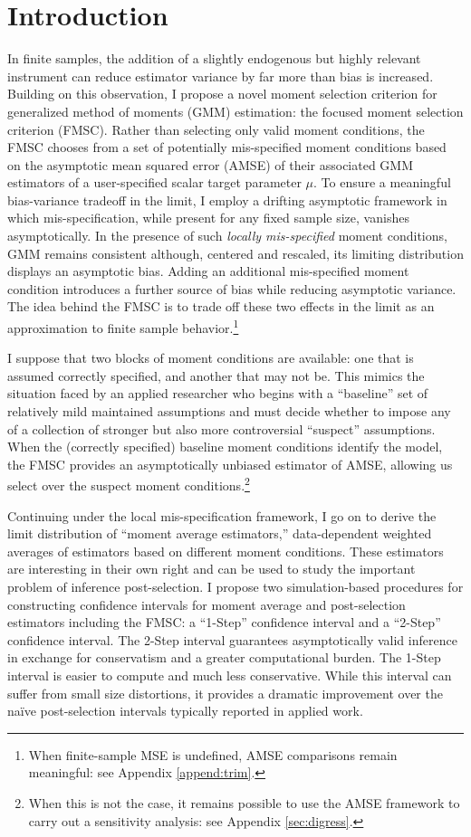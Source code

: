 \section{Introduction}
In finite samples, the addition of a slightly endogenous but highly relevant instrument can reduce estimator variance by far more than bias is increased. 
Building on this observation, I propose a novel moment selection criterion for generalized method of moments (GMM) estimation: the focused moment selection criterion (FMSC). 
Rather than selecting only valid moment conditions, the FMSC chooses from a set of potentially mis-specified moment conditions based on the asymptotic mean squared error (AMSE) of their associated GMM estimators of a user-specified scalar target parameter $\mu$.
To ensure a meaningful bias-variance tradeoff in the limit, I employ a drifting asymptotic framework in which mis-specification, while present for any fixed sample size, vanishes asymptotically.
In the presence of such \emph{locally mis-specified} moment conditions, GMM remains consistent although, centered and rescaled, its limiting distribution displays an asymptotic bias. Adding an additional mis-specified moment condition introduces a further source of bias while reducing asymptotic variance. 
The idea behind the FMSC is to trade off these two effects in the limit as an approximation to finite sample behavior.\footnote{When finite-sample MSE is undefined, AMSE comparisons remain meaningful: see Appendix \ref{append:trim}.}

 
I suppose that two blocks of moment conditions are available: one that is assumed correctly specified, and another that may not be.
This mimics the situation faced by an applied researcher who begins with a ``baseline'' set of relatively mild maintained assumptions and must decide whether to impose any of a collection of stronger but also more controversial ``suspect'' assumptions.
When the (correctly specified) baseline moment conditions identify the model, the FMSC provides an asymptotically unbiased estimator of AMSE, allowing us select over the suspect moment conditions.\footnote{When this is not the case, it remains possible to use the AMSE framework to carry out a sensitivity analysis: see Appendix \ref{sec:digress}.}

Continuing under the local mis-specification framework, I go on to derive the limit distribution of ``moment average estimators,'' data-dependent weighted averages of estimators based on different moment conditions.
These estimators are interesting in their own right and can be used to study the important problem of inference post-selection.
I propose two simulation-based procedures for constructing confidence intervals for moment average and post-selection estimators including the FMSC: a ``1-Step'' confidence interval and a ``2-Step'' confidence interval.
The 2-Step interval guarantees asymptotically valid inference in exchange for conservatism and a greater computational burden.
The 1-Step interval is easier to compute and much less conservative.
While this interval can suffer from small size distortions, it provides a dramatic improvement over the na\"{i}ve post-selection intervals typically reported in applied work.

